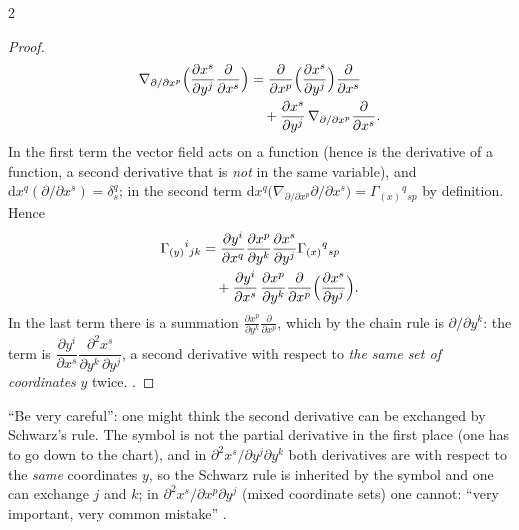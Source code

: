 \begin{paracol}{2}
\begin{proof}
\begin{align*}
  \nabla_{\partial/\partial x^p}\Bigl(\frac{\partial x^s}{\partial y^j}\frac{\partial}{\partial x^s}\Bigr)&=\frac{\partial}{\partial x^p}\Bigl(\frac{\partial x^s}{\partial y^j}\Bigr)\frac{\partial}{\partial x^s}\\ &\quad+\frac{\partial x^s}{\partial y^j}\,\nabla_{\partial/\partial x^p}\frac{\partial}{\partial x^s}.
\end{align*}
In the first term the vector field acts on a function (hence is the derivative of a function, a second derivative that is \emph{not} in the same variable), and $\mathrm dx^q(\partial/\partial x^s)=\delta^q_s$; in the second term $\mathrm dx^q\bigl(\nabla_{\partial/\partial x^p}\partial/\partial x^s\bigr)=\Gamma_{(x)}{}^q{}_{sp}$ by definition. Hence
\begin{align*}
  \Gamma_{(y)}{}^i{}_{jk}&=\frac{\partial y^i}{\partial x^q}\frac{\partial x^p}{\partial y^k}\frac{\partial x^s}{\partial y^j}\Gamma_{(x)}{}^q{}_{sp}\\ &\quad+\frac{\partial y^i}{\partial x^s}\,\frac{\partial x^p}{\partial y^k}\frac{\partial}{\partial x^p}\Bigl(\frac{\partial x^s}{\partial y^j}\Bigr).
\end{align*}
In the last term there is a summation $\frac{\partial x^p}{\partial y^k}\frac{\partial}{\partial x^p}$, which by the chain rule is $\partial/\partial y^k$: the term is $\dfrac{\partial y^i}{\partial x^s}\dfrac{\partial^2x^s}{\partial y^k\,\partial y^j}$, a second derivative with respect to \emph{the same set of coordinates} $y$ twice.
.
\end{proof}

\begin{coursenote}
``Be very careful'': one might think the second derivative can be exchanged by Schwarz's rule. The symbol is not the partial derivative in the first place (one has to go down to the chart), and in $\partial^2x^s/\partial y^j\partial y^k$ both derivatives are with respect to the \emph{same} coordinates $y$, so the Schwarz rule is inherited by the symbol and one can exchange $j$ and $k$; in $\partial^2x^s/\partial x^p\partial y^j$ (mixed coordinate sets) one cannot: ``very important, very common mistake''
.
\end{coursenote}


\end{paracol}
